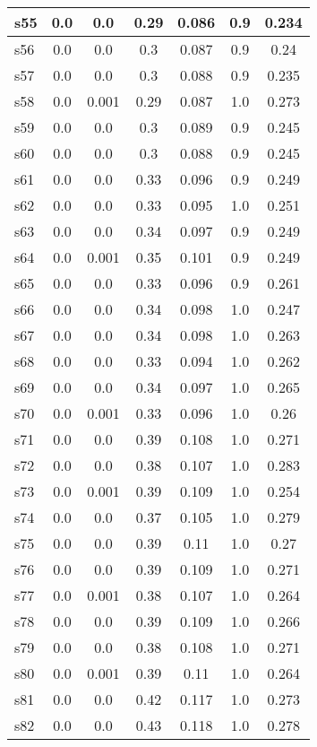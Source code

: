 \documentclass{article}
\begin{document}
\begin{tabular}{|l|c|c|c|c|c|c|}
s55 &0.0 & 0.0 & 0.29 & 0.086 & 0.9 & 0.234\\
\hline
s56 &0.0 & 0.0 & 0.3 & 0.087 & 0.9 & 0.24\\
\hline
s57 &0.0 & 0.0 & 0.3 & 0.088 & 0.9 & 0.235\\
\hline
s58 &0.0 & 0.001 & 0.29 & 0.087 & 1.0 & 0.273\\
\hline
s59 &0.0 & 0.0 & 0.3 & 0.089 & 0.9 & 0.245\\
\hline
s60 &0.0 & 0.0 & 0.3 & 0.088 & 0.9 & 0.245\\
\hline
s61 &0.0 & 0.0 & 0.33 & 0.096 & 0.9 & 0.249\\
\hline
s62 &0.0 & 0.0 & 0.33 & 0.095 & 1.0 & 0.251\\
\hline
s63 &0.0 & 0.0 & 0.34 & 0.097 & 0.9 & 0.249\\
\hline
s64 &0.0 & 0.001 & 0.35 & 0.101 & 0.9 & 0.249\\
\hline
s65 &0.0 & 0.0 & 0.33 & 0.096 & 0.9 & 0.261\\
\hline
s66 &0.0 & 0.0 & 0.34 & 0.098 & 1.0 & 0.247\\
\hline
s67 &0.0 & 0.0 & 0.34 & 0.098 & 1.0 & 0.263\\
\hline
s68 &0.0 & 0.0 & 0.33 & 0.094 & 1.0 & 0.262\\
\hline
s69 &0.0 & 0.0 & 0.34 & 0.097 & 1.0 & 0.265\\
\hline
s70 &0.0 & 0.001 & 0.33 & 0.096 & 1.0 & 0.26\\
\hline
s71 &0.0 & 0.0 & 0.39 & 0.108 & 1.0 & 0.271\\
\hline
s72 &0.0 & 0.0 & 0.38 & 0.107 & 1.0 & 0.283\\
\hline
s73 &0.0 & 0.001 & 0.39 & 0.109 & 1.0 & 0.254\\
\hline
s74 &0.0 & 0.0 & 0.37 & 0.105 & 1.0 & 0.279\\
\hline
s75 &0.0 & 0.0 & 0.39 & 0.11 & 1.0 & 0.27\\
\hline
s76 &0.0 & 0.0 & 0.39 & 0.109 & 1.0 & 0.271\\
\hline
s77 &0.0 & 0.001 & 0.38 & 0.107 & 1.0 & 0.264\\
\hline
s78 &0.0 & 0.0 & 0.39 & 0.109 & 1.0 & 0.266\\
\hline
s79 &0.0 & 0.0 & 0.38 & 0.108 & 1.0 & 0.271\\
\hline
s80 &0.0 & 0.001 & 0.39 & 0.11 & 1.0 & 0.264\\
\hline
s81 &0.0 & 0.0 & 0.42 & 0.117 & 1.0 & 0.273\\
\hline
s82 &0.0 & 0.0 & 0.43 & 0.118 & 1.0 & 0.278\\

\end{tabular}
\end{document}
